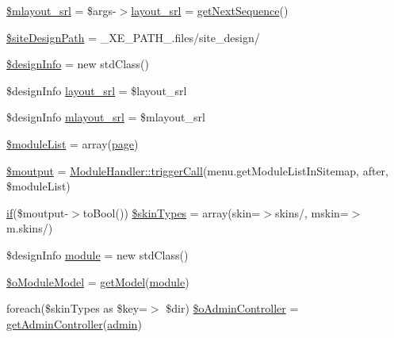 \begin{DoxyCompactItemize}
\item 
\hyperlink{ko_8install_8php_a576210f0eec2e42df2c40e04a3972bb0}{\$mlayout\+\_\+srl} = \$args-\/$>$\hyperlink{ko_8install_8php_a70054876db09b2519a1726663c8dd9e7}{layout\+\_\+srl} = \hyperlink{func_8inc_8php_a5a97b458f9c5b4fe3574671840aee27c}{get\+Next\+Sequence}()
\item 
\hyperlink{ko_8install_8php_a0b79a974b91157b79d83cc0be7e3247c}{\$site\+Design\+Path} = \+\_\+\+X\+E\+\_\+\+P\+A\+T\+H\+\_\+.\textquotesingle{}files/site\+\_\+design/\textquotesingle{}
\item 
\hyperlink{ko_8install_8php_a99e144f7d563ceb76b003d54739b3b0c}{\$design\+Info} = new std\+Class()
\item 
\$design\+Info \hyperlink{ko_8install_8php_a70054876db09b2519a1726663c8dd9e7}{layout\+\_\+srl} = \$layout\+\_\+srl
\item 
\$design\+Info \hyperlink{ko_8install_8php_a9cf497537007b08c645bed35f564be54}{mlayout\+\_\+srl} = \$mlayout\+\_\+srl
\item 
\hyperlink{ko_8install_8php_aaa80946d50e2d3677fbbc6d6c8a643c3}{\$module\+List} = array(\textquotesingle{}\hyperlink{classpage}{page}\textquotesingle{})
\item 
\hyperlink{ko_8install_8php_a2598d068355cca17645bc6bd70cc3a8c}{\$moutput} = \hyperlink{classModuleHandler_aa1b1f9eae91ccd76e6a81c9375c2e673}{Module\+Handler\+::trigger\+Call}(\textquotesingle{}menu.\+get\+Module\+List\+In\+Sitemap\textquotesingle{}, \textquotesingle{}after\textquotesingle{}, \$module\+List)
\item 
\hyperlink{point__level__icon_8addon_8php_a29031816e50a8f742422e671b2bef9b2}{if}(\$moutput-\/$>$to\+Bool()) \hyperlink{ko_8install_8php_aa61073b7b359568eb3459da113fd8cdf}{\$skin\+Types} = array(\textquotesingle{}skin\textquotesingle{}=$>$\textquotesingle{}skins/\textquotesingle{}, \textquotesingle{}mskin\textquotesingle{}=$>$\textquotesingle{}m.\+skins/\textquotesingle{})
\item 
\$design\+Info \hyperlink{ko_8install_8php_a5c3fc1968f94c2b6a7c60845f284de78}{module} = new std\+Class()
\item 
\hyperlink{ko_8install_8php_a8d7a87df524e7d6938f66f8e284cdd1e}{\$o\+Module\+Model} = \hyperlink{func_8inc_8php_aecdfcc5332bcf22df01fc21a03b64435}{get\+Model}(\textquotesingle{}\hyperlink{classmodule}{module}\textquotesingle{})
\item 
foreach(\$skin\+Types as \$key=$>$ \$dir) \hyperlink{ko_8install_8php_a4e2098076e50f24dd86e1062844d25d5}{\$o\+Admin\+Controller} = \hyperlink{func_8inc_8php_a2f7ca88a5226536aca3b2f5682bd7b2d}{get\+Admin\+Controller}(\textquotesingle{}\hyperlink{classadmin}{admin}\textquotesingle{})

\end{DoxyCompactItemize}
